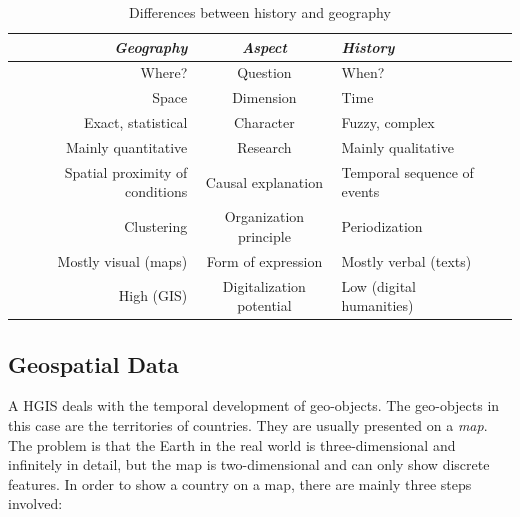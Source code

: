 \begin{table}[ht]
\begin{center}
\begin{tabular}{p{0px} r c l p{0px}}
    \toprule
    & \emph{Geography}
    & \emph{Aspect}
    & \emph{History}
    & \\
    \midrule
    & Where?
    & Question
    & When?
    & \\

    & Space
    & Dimension
    & Time
    & \\

    & Exact, statistical
    & Character
    & Fuzzy, complex
    & \\

    & Mainly quantitative
    & Research
    & Mainly qualitative
    & \\

    & Spatial proximity of conditions
    & Causal explanation
    & Temporal sequence of events
    & \\

    & Clustering
    & Organization principle
    & Periodization
    & \\

    & Mostly visual (maps)
    & Form of expression
    & Mostly verbal (texts)
    & \\

    & High (GIS)
    & Digitalization potential
    & Low (digital humanities)
    & \\

    \bottomrule
\end{tabular}
\caption{Differences between history and geography \cite[pp. 2-4]{knowles2008placing}}
\label{tab:history_vs_geography}
\end{center}
\end{table}


\subsection{Geospatial Data} %
\label{sub:geospatial_data}

A HGIS deals with the temporal development of geo-objects. The geo-objects in this case are the territories of countries. They are usually presented on a \emph{map}. The problem is that the Earth in the real world is three-dimensional and infinitely in detail, but the map is two-dimensional and can only show discrete features. In order to show a country on a map, there are mainly three steps involved:

